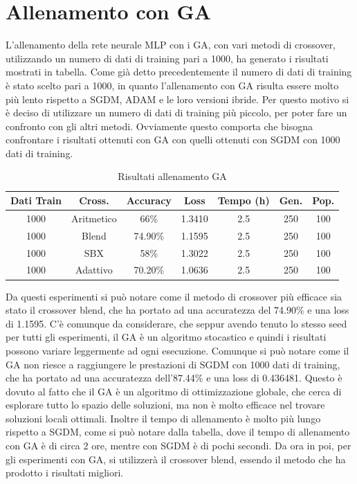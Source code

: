 \section{Allenamento con GA}
    L'allenamento della rete neurale MLP con i GA, con vari metodi di crossover, utilizzando un numero di dati di training pari a 1000, ha generato i risultati mostrati in tabella.
    Come già detto precedentemente il numero di dati di training è stato scelto pari a 1000, in quanto l'allenamento con GA risulta essere molto più lento rispetto a SGDM, ADAM e le loro versioni ibride.
    Per questo motivo si è deciso di utilizzare un numero di dati di training più piccolo, per poter fare un confronto con gli altri metodi. Ovviamente questo comporta che bisogna confrontare i risultati
    ottenuti con GA con quelli ottenuti con SGDM con 1000 dati di training.
\begin{table}[htbp]
\centering
\begin{tabular}{|c|c|c|c|c|c|c|}
\hline
\textbf{Dati Train} & \textbf{Cross.} & \textbf{Accuracy} & \textbf{Loss} & \textbf{Tempo (h)} & \textbf{Gen.} & \textbf{Pop.} \\
\hline
1000 & Aritmetico & 66\% & 1.3410 & 2.5 & 250 & 100 \\
\hline
1000 & Blend & 74.90\% & 1.1595 & 2.5 & 250 & 100 \\
\hline
1000 & SBX & 58\% & 1.3022 & 2.5 & 250 & 100 \\
\hline
1000 & Adattivo & 70.20\% & 1.0636 & 2.5 & 250 & 100 \\
\hline
\end{tabular}
\label{tab:GA_results}
\caption{Risultati allenamento GA}
\end{table}
    Da questi esperimenti si può notare come il metodo di crossover più efficace sia stato il crossover blend, che ha portato ad una accuratezza del 74.90\% e una loss di 1.1595.
    C'è comunque da considerare, che seppur avendo tenuto lo stesso seed per tutti gli esperimenti, il GA è un algoritmo stocastico e quindi i risultati possono variare leggermente ad ogni esecuzione.
    Comunque si può notare come il GA non riesce a raggiungere le prestazioni di SGDM con 1000 dati di training, che ha portato ad una accuratezza dell'87.44\% e una loss di 0.436481.
    Questo è dovuto al fatto che il GA è un algoritmo di ottimizzazione globale, che cerca di esplorare tutto lo spazio delle soluzioni, ma non è molto efficace nel trovare soluzioni locali ottimali.
    Inoltre il tempo di allenamento è molto più lungo rispetto a SGDM, come si può notare dalla tabella, dove il tempo di allenamento con GA è di circa 2 ore, mentre con SGDM è di pochi secondi.
    Da ora in poi, per gli esperimenti con GA, si utilizzerà il crossover blend, essendo il metodo che ha prodotto i risultati migliori.
